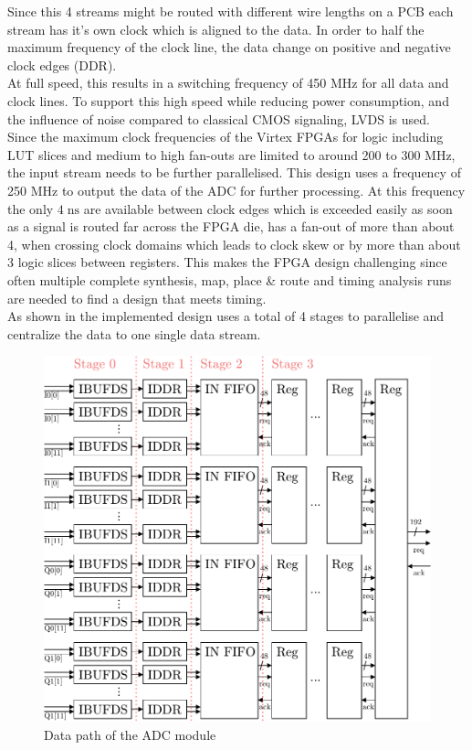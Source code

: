 Since this 4 streams might be routed with different wire lengths on a \gls{PCB}
each stream has it's own clock which is aligned to the data.
In order to half the maximum frequency of the clock line,
the data change on positive and negative clock edges (\gls{DDR}). \\

At full speed, this results in a switching frequency of 450 MHz for all data
and clock lines. To support this high speed while reducing power consumption,
and the influence of noise compared to classical \gls{CMOS} signaling,
\gls{LVDS} is used. \\

Since the maximum clock frequencies of the Virtex \glspl{FPGA} for logic
including \gls{LUT} slices and medium to high fan-outs
are limited to around 200 to 300 MHz, the input stream needs to be further
parallelised. This design uses a frequency of 250 MHz to output
the data of the \gls{ADC} for further processing. At this frequency
the only $4\;\text{ns}$ are available between clock edges which is exceeded
easily as soon as a signal is routed far across the \gls{FPGA} die,
has a fan-out of more than about 4, when crossing clock domains which leads
to clock skew or by more than about 3 logic slices between registers.
This makes the \gls{FPGA} design challenging since often multiple
complete synthesis, map, place \& route and timing analysis runs are
needed to find a design that meets timing. \\

As shown in  the implemented design uses
a total of 4 stages to parallelise and centralize the data to
one single data stream. \\

\begin{figure}[ht]
  \centering
  \includegraphics[width=\textwidth]{figures/fpga_adc}
  \caption{Data path of the \gls{ADC} module}
  \label{fig:fpga_adc}
\end{figure}

